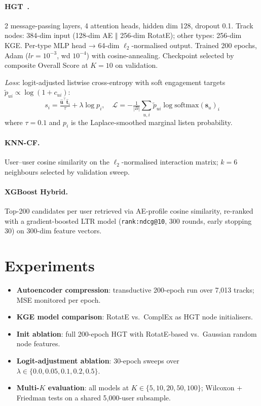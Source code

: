 \documentclass[10pt,twocolumn,letterpaper]{article}
\begin{document}
\paragraph{HGT~\cite{hu2020hgt}.}
2 message-passing layers, 4 attention heads, hidden dim 128, dropout 0.1. Track nodes: 384-dim input (128-dim AE $\Vert$ 256-dim RotatE); other types: 256-dim KGE. Per-type MLP head → 64-dim $\ell_2$-normalised output. Trained 200 epochs, Adam ($lr{=}10^{-3}$, wd $10^{-4}$) with cosine-annealing. Checkpoint selected by composite Overall Score at $K{=}10$ on validation.

\textit{Loss}: logit-adjusted listwise cross-entropy with soft engagement targets $\tilde{p}_{ui}\propto\log(1+c_{ui})$:
\begin{equation*}
s_i = \tfrac{\hat{\mathbf{u}}^\top\hat{\mathbf{t}}_i}{\tau} + \lambda\log p_i,\quad
\mathcal{L}=-\tfrac{1}{|B|}\sum_{u,i}\tilde{p}_{ui}\log\mathrm{softmax}(\mathbf{s}_u)_i
\end{equation*}
where $\tau{=}0.1$ and $p_i$ is the Laplace-smoothed marginal listen probability.

\paragraph{KNN-CF.} User--user cosine similarity on the $\ell_2$-normalised interaction matrix; $k{=}6$ neighbours selected by validation sweep.

\paragraph{XGBoost Hybrid.} Top-200 candidates per user retrieved via AE-profile cosine similarity, re-ranked with a gradient-boosted LTR model (\texttt{rank:ndcg@10}, 300 rounds, early stopping 30) on 300-dim feature vectors.

\section{Experiments}
\label{sec:experiments}

\begin{itemize}\setlength\itemsep{0pt}
  \item \textbf{Autoencoder compression}: transductive 200-epoch run over 7,013 tracks; MSE monitored per epoch.
  \item \textbf{KGE model comparison}: RotatE vs.\ ComplEx as HGT node initialisers.
  \item \textbf{Init ablation}: full 200-epoch HGT with RotatE-based vs.\ Gaussian random node features.
  \item \textbf{Logit-adjustment ablation}: 30-epoch sweeps over $\lambda\in\{0.0,\allowbreak 0.05,\allowbreak 0.1,\allowbreak 0.2,\allowbreak 0.5\}$.
  \item \textbf{Multi-$K$ evaluation}: all models at $K\in\{5,10,20,50,100\}$; Wilcoxon + Friedman tests on a shared 5,000-user subsample.
\end{itemize}
\end{document}
